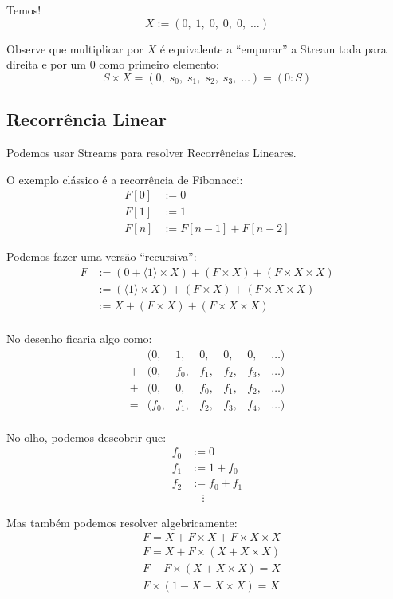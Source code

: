 \documentclass{article}
\newcommand{\ins}[1]{\langle #1 \rangle}
\begin{document}
Temos!
\[
    X := (0, \; 1, \; 0, \; 0, \; 0, \; \dots)
\]

Observe que multiplicar por \(X\)
é equivalente a ``empurar'' a Stream
toda para direita
e por um 0 como primeiro elemento:
\[
    S \times X
    = (0, \; s_0, \; s_1, \; s_2, \; s_3, \; \dots)
    = (0 : S)
\]

\subsection{Recorrência Linear}

Podemos usar Streams para resolver Recorrências Lineares.

O exemplo clássico é a recorrência de Fibonacci:
\begin{align*}
    F[0] &:= 0 \\
    F[1] &:= 1 \\
    F[n] &:= F[n-1] + F[n-2]
\end{align*}

Podemos fazer uma versão ``recursiva'':
\begin{align*}
    F &:=
        (0 + \ins{1} \times X)
        + (F \times X)
        + (F \times X \times X) \\
    &:=
        (\ins{1} \times X)
        + (F \times X)
        + (F \times X \times X) \\
    &:=
        X
        + (F \times X)
        + (F \times X \times X) \\
\end{align*}

No desenho ficaria algo como:
\[
    \begin{array}{ccccccc}
     & (  0, &   1, &   0, &   0, &   0, & \dots) \\
    +& (  0, & f_0, & f_1, & f_2, & f_3, & \dots) \\
    +& (  0, &   0, & f_0, & f_1, & f_2, & \dots) \\ \hline
    =& (f_0, & f_1, & f_2, & f_3, & f_4, & \dots) \\
    \end{array}
\]

No olho, podemos descobrir que:
\begin{align*}
    f_0 &:= 0 \\
    f_1 &:= 1 + f_0 \\
    f_2 &:= f_0 + f_1 \\
    &\quad\vdots
\end{align*}

Mas também podemos resolver algebricamente:
\begin{align*}
    &F = X + F \times X + F \times X \times X \\
    &F = X + F \times (X + X \times X) \\
    &F - F \times (X + X \times X) = X \\
    &F \times (1 - X - X \times X) = X \\
\end{align*}
\end{document}
